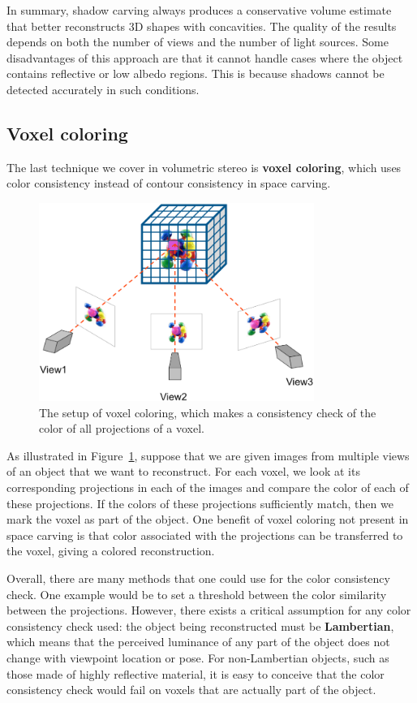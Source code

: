 \documentclass[a4paper, 12pt]{article}
\renewcommand\emph{\textbf}
\numberwithin{equation}{section}
\begin{document}
In summary, shadow carving always produces a conservative volume estimate that better reconstructs 3D shapes with concavities. The quality of the results depends on both the number of views and the number of light sources. Some disadvantages of this approach are that it cannot handle cases where the object contains reflective or low albedo regions. This is because shadows cannot be detected accurately in such conditions.

\subsection{Voxel coloring}
The last technique we cover in volumetric stereo is \emph{voxel coloring}, which uses color consistency instead of contour consistency in space carving.

\begin{figure}[h!]
    \centering
    \includegraphics[width = 0.8\textwidth]{figures/voxel_coloring.png}
    \caption{The setup of voxel coloring, which makes a consistency check of the color of all projections of a voxel.}
    \label{fig:voxel_coloring}
\end{figure}

As illustrated in Figure~\ref{fig:voxel_coloring}, suppose that we are given images from multiple views of an object that we want to reconstruct. For each voxel, we look at its corresponding projections in each of the images and compare the color of each of these projections. If the colors of these projections sufficiently match, then we mark the voxel as part of the object. One benefit of voxel coloring not present in space carving is that color associated with the projections can be transferred to the voxel, giving a colored reconstruction.

Overall, there are many methods that one could use for the color consistency check. One example would be to set a threshold between the color similarity between the projections. However, there exists a critical assumption for any color consistency check used: the object being reconstructed must be \emph{Lambertian}, which means that the perceived luminance of any part of the object does not change with viewpoint location or pose. For non-Lambertian objects, such as those made of highly reflective material, it is easy to conceive that the color consistency check would fail on voxels that are actually part of the object.
\end{document}
